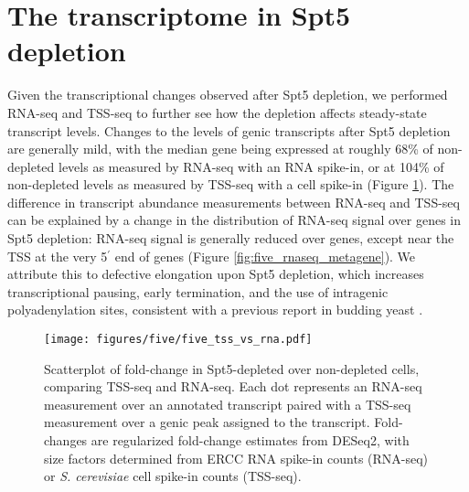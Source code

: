 \section{The transcriptome in Spt5 depletion}
\label{sec:five_transcriptome}

Given the transcriptional changes observed after Spt5 depletion, we performed RNA-seq and TSS-seq to further see how the depletion affects steady-state transcript levels.
Changes to the levels of genic transcripts after Spt5 depletion are generally mild, with the median gene being expressed at roughly 68\% of non-depleted levels as measured by RNA-seq with an RNA spike-in, or at 104\% of non-depleted levels as measured by TSS-seq with a cell spike-in (Figure \ref{fig:five_tss_vs_rna}).
The difference in transcript abundance measurements between RNA-seq and TSS-seq can be explained by a change in the distribution of RNA-seq signal over genes in Spt5 depletion: RNA-seq signal is generally reduced over genes, except near the TSS at the very 5$^\prime$ end of genes (Figure \ref{fig:five_rnaseq_metagene}).
We attribute this to defective elongation upon Spt5 depletion, which increases transcriptional pausing, early termination, and the use of intragenic polyadenylation sites, consistent with a previous report in budding yeast \citep{cui2003}.
\begin{figure}[h]
    \centering
    \texttt{[image: figures/five/five\_tss\_vs\_rna.pdf]}
    \caption[Scatterplot of fold-change in Spt5-depleted over non-depleted cells, comparing TSS-seq and RNA-seq.]{Scatterplot of fold-change in Spt5-depleted over non-depleted cells, comparing TSS-seq and RNA-seq. Each dot represents an RNA-seq measurement over an annotated transcript paired with a TSS-seq measurement over a genic peak assigned to the transcript. Fold-changes are regularized fold-change estimates from DESeq2, with size factors determined from ERCC RNA spike-in counts (RNA-seq) or \textit{S. cerevisiae} cell spike-in counts (TSS-seq).}
    \label{fig:five_tss_vs_rna}
\end{figure}

